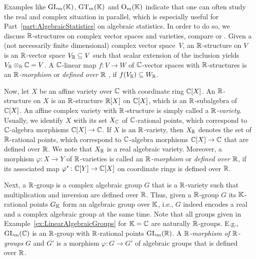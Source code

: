 Examples like $\operatorname{GL}_m(\mathbb K)$, $\operatorname{GT}_m(\mathbb K)$ and $\operatorname{O}_m(\mathbb K)$ indicate that  one can often study the real and complex situation in parallel, which is especially useful for Part~\ref{part:AlgebraicStatistics} on algebraic statistics.
In order to do so, we discuss $\mathbb R$-structures on complex vector spaces and varieties, compare \cite[AG~§11 and~§12]{BorelBook} or \cite[Chapter~11]{SpringerBook}.  Given a (not necessarily finite dimensional) complex vector space~$V$, an $\mathbb R$-structure on $V$ is an $\mathbb R$-vector space $V_\mathbb R \subseteq V$ such that scalar extension of the inclusion yields $V_\mathbb R \otimes_{\mathbb R} \mathbb C = V$. A $\mathbb C$-linear map $f \colon V \to W$ of $\mathbb C$-vector spaces with $\mathbb R$-structures is an \emph{$\mathbb R$-morphism} or \emph{defined over $\mathbb R$} , if $f(V_{\mathbb R}) \subseteq W_{\mathbb R}$.

Now, let $X$ be an affine variety over $\mathbb C$ with coordinate ring $\mathbb C[X]$.
An $\mathbb R$-structure on $X$ is an $\mathbb R$-structure $\mathbb R[X]$ on $\mathbb C[X]$, which is an $\mathbb R$-subalgebra of $\mathbb C[X]$. An affine complex variety with $\mathbb R$-structure is simply called a \emph{$\mathbb R$-variety}.
Usually, we identify $X$ with its set $X_{\mathbb C}$ of $\mathbb C$-rational points, which correspond to $\mathbb C$-algebra morphisms $\mathbb C[X] \to \mathbb C$. If $X$ is an $\mathbb R$-variety, then $X_\mathbb R$ denotes the set of $\mathbb R$-rational points, which correspond to $\mathbb C$-algebra morphisms $\mathbb C[X] \to \mathbb C$ that are defined over $\mathbb R$. We note that $X_{\mathbb R}$ is a real algebraic variety.
Moreover, a morphism $\varphi \colon X \to Y$ of $\mathbb R$-varieties is called an \emph{$\mathbb R$-morphism} or \emph{defined over $\mathbb R$}, if its associated map $\varphi^{\ast} \colon \mathbb C[Y] \to \mathbb C[X]$ on coordinate rings is defined over $\mathbb R$.

Next, a $\mathbb R$-group is a complex algebraic group $G$ that is a $\mathbb R$-variety such that multiplication and inversion are defined over $\mathbb R$. Thus, given a $\mathbb R$-group $G$ its $\mathbb K$-rational points $G_{\mathbb K}$ form an algebraic group over $\mathbb K$, i.e., $G$ indeed encodes a real and a complex algebraic group at the same time. Note that all groups given in Example~\ref{ex:LinearAlgebraicGroups} for $\mathbb K = \mathbb C$ are naturally $\mathbb R$-groups. E.g., $\operatorname{GL}_m(\mathbb C)$ is an $\mathbb R$-group with $\mathbb R$-rational points $\operatorname{GL}_m(\mathbb R)$. A \emph{$\mathbb R$-morphism of $\mathbb R$-groups} $G$ and $G'$ is a morphism $\varphi \colon G \to G'$ of algebraic groups that is defined over $\mathbb R$.

